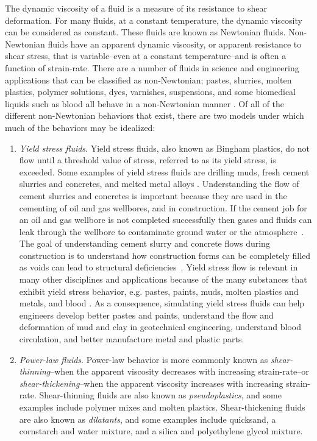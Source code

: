 \documentclass[pdftex,ms]{pittetd}
\begin{document}
The dynamic viscosity of a fluid is a measure of its resistance to shear deformation.
For many fluids, at a constant temperature, the dynamic viscosity can be considered as constant.
These fluids are known as Newtonian fluids.
Non-Newtonian fluids have an apparent dynamic viscosity, or apparent resistance to shear stress, that is variable--even at a constant temperature--and is often a function of strain-rate.
There are a number of fluids in science and engineering applications that can be classified as non-Newtonian; pastes, slurries, molten plastics, polymer solutions, dyes, varnishes, suspensions, and some biomedical liquids such as blood all behave in a non-Newtonian manner \cite{bohme1987non}.
Of all of the different non-Newtonian behaviors that exist, there are two models under which much of the behaviors may be idealized:
\begin{enumerate}
	\item \emph{Yield stress fluids}. Yield stress fluids, also known as Bingham plastics, do not flow until a threshold value of stress, referred to as its yield stress, is exceeded.
	Some examples of yield stress fluids are drilling muds, fresh cement slurries and concretes, and melted metal alloys \cite{ginzburg2002free}.
	Understanding the flow of cement slurries and concretes is important because they are used in the cementing of oil and gas wellbores, and in construction.
	If the cement job for an oil and gas wellbore is not completed successfully then gases and fluids can leak through the wellbore to contaminate ground water or the atmosphere~\cite{grasinger2015simulation}. %
	The goal of understanding cement slurry and concrete flows during construction is to understand how construction forms can be completely filled as voids can lead to structural deficiencies~\cite{definitely cite someone}.
	Yield stress flow is relevant in many other disciplines and applications because of the many substances that exhibit yield stress behavior, e.g. pastes, paints, muds, molten plastics and metals, and blood \cite{wang2011lattice}. %
	As a consequence, simulating yield stress fluids can help engineers develop better pastes and paints, understand the flow and deformation of mud and clay in geotechnical engineering, understand blood circulation, and better manufacture metal and plastic parts.
	
	\item \emph{Power-law fluids}. Power-law behavior is more commonly known as \emph{shear-thinning}--when the apparent viscosity decreases with increasing strain-rate--or \emph{shear-thickening}--when the apparent viscosity increases with increasing strain-rate. Shear-thinning fluids are also known as \emph{pseudoplastics}, and some examples include polymer mixes and molten plastics.
	Shear-thickening fluids are also known as \emph{dilatants}, and some examples include quicksand, a cornstarch and water mixture, and a silica and polyethylene glycol mixture.
\end{enumerate}
\end{document}

